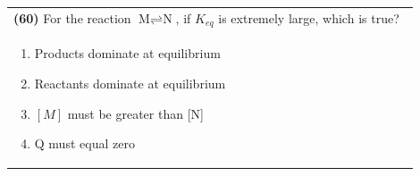 \documentclass{article}
\begin{document}
\noindent\begin{tabular}{|p{0.9\linewidth}|}
\hline
\textbf{(60)} For the reaction $\text{M} \rightleftharpoons \text{N}$, if $K_{eq}$ is extremely large, which is true?\\[0.2cm]
\begin{minipage}[t]{0.85\linewidth}
\begin{enumerate}[label=\alph*.]
\item Products dominate at equilibrium
\item Reactants dominate at equilibrium
\item $[M]$ must be greater than [N]
\item Q must equal zero
\end{enumerate}
\end{minipage}\\[0.2cm]
\hline
\end{tabular}
\end{document}
